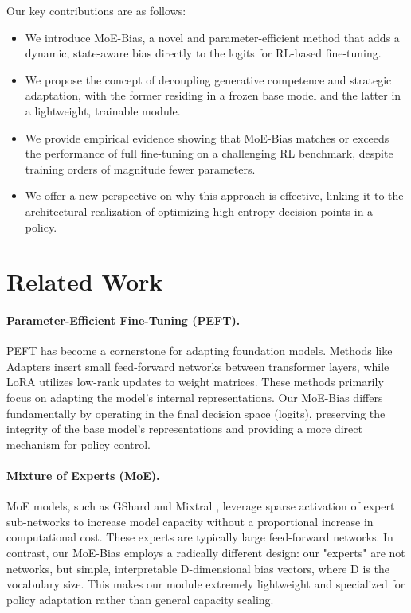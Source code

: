 \documentclass[a4paper]{article}
\begin{document}
Our key contributions are as follows:
\begin{itemize}
    \item We introduce MoE-Bias, a novel and parameter-efficient method that adds a dynamic, state-aware bias directly to the logits for RL-based fine-tuning.
    \item We propose the concept of decoupling generative competence and strategic adaptation, with the former residing in a frozen base model and the latter in a lightweight, trainable module.
    \item We provide empirical evidence showing that MoE-Bias matches or exceeds the performance of full fine-tuning on a challenging RL benchmark, despite training orders of magnitude fewer parameters. %
    \item We offer a new perspective on why this approach is effective, linking it to the architectural realization of optimizing high-entropy decision points in a policy.
\end{itemize}


\section{Related Work}

\paragraph{Parameter-Efficient Fine-Tuning (PEFT).}
PEFT has become a cornerstone for adapting foundation models. Methods like Adapters \cite{...} %
insert small feed-forward networks between transformer layers, while LoRA \cite{...} %
utilizes low-rank updates to weight matrices. These methods primarily focus on adapting the model's internal representations. Our MoE-Bias differs fundamentally by operating in the final decision space (logits), preserving the integrity of the base model's representations and providing a more direct mechanism for policy control.

\paragraph{Mixture of Experts (MoE).}
MoE models, such as GShard \cite{...} and Mixtral \cite{...}, %
leverage sparse activation of expert sub-networks to increase model capacity without a proportional increase in computational cost. These experts are typically large feed-forward networks. In contrast, our MoE-Bias employs a radically different design: our "experts" are not networks, but simple, interpretable D-dimensional bias vectors, where D is the vocabulary size. This makes our module extremely lightweight and specialized for policy adaptation rather than general capacity scaling.
\end{document}
